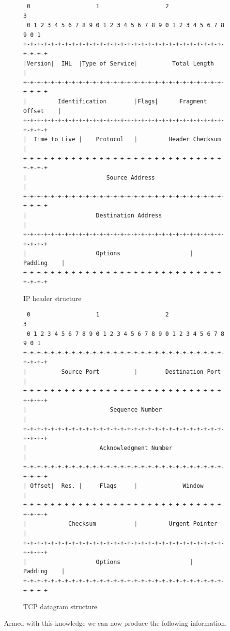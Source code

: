 \documentclass{article}
\begin{document}
\begin{figure}[H]
    \centering
    \caption{IP header structure}
    \begin{lstlisting}
 0                   1                   2                   3   
 0 1 2 3 4 5 6 7 8 9 0 1 2 3 4 5 6 7 8 9 0 1 2 3 4 5 6 7 8 9 0 1 
+-+-+-+-+-+-+-+-+-+-+-+-+-+-+-+-+-+-+-+-+-+-+-+-+-+-+-+-+-+-+-+-+
|Version|  IHL  |Type of Service|          Total Length         |
+-+-+-+-+-+-+-+-+-+-+-+-+-+-+-+-+-+-+-+-+-+-+-+-+-+-+-+-+-+-+-+-+
|         Identification        |Flags|      Fragment Offset    |
+-+-+-+-+-+-+-+-+-+-+-+-+-+-+-+-+-+-+-+-+-+-+-+-+-+-+-+-+-+-+-+-+
|  Time to Live |    Protocol   |         Header Checksum       |
+-+-+-+-+-+-+-+-+-+-+-+-+-+-+-+-+-+-+-+-+-+-+-+-+-+-+-+-+-+-+-+-+
|                       Source Address                          |
+-+-+-+-+-+-+-+-+-+-+-+-+-+-+-+-+-+-+-+-+-+-+-+-+-+-+-+-+-+-+-+-+
|                    Destination Address                        |
+-+-+-+-+-+-+-+-+-+-+-+-+-+-+-+-+-+-+-+-+-+-+-+-+-+-+-+-+-+-+-+-+
|                    Options                    |    Padding    |
+-+-+-+-+-+-+-+-+-+-+-+-+-+-+-+-+-+-+-+-+-+-+-+-+-+-+-+-+-+-+-+-+
    \end{lstlisting}
\end{figure}
\begin{figure}[H]
    \centering
    \caption{TCP datagram structure}
    \begin{lstlisting}
 0                   1                   2                   3
 0 1 2 3 4 5 6 7 8 9 0 1 2 3 4 5 6 7 8 9 0 1 2 3 4 5 6 7 8 9 0 1
+-+-+-+-+-+-+-+-+-+-+-+-+-+-+-+-+-+-+-+-+-+-+-+-+-+-+-+-+-+-+-+-+
|          Source Port          |        Destination Port       |
+-+-+-+-+-+-+-+-+-+-+-+-+-+-+-+-+-+-+-+-+-+-+-+-+-+-+-+-+-+-+-+-+
|                        Sequence Number                        |
+-+-+-+-+-+-+-+-+-+-+-+-+-+-+-+-+-+-+-+-+-+-+-+-+-+-+-+-+-+-+-+-+
|                     Acknowledgment Number                     |
+-+-+-+-+-+-+-+-+-+-+-+-+-+-+-+-+-+-+-+-+-+-+-+-+-+-+-+-+-+-+-+-+
| Offset|  Res. |     Flags     |             Window            |
+-+-+-+-+-+-+-+-+-+-+-+-+-+-+-+-+-+-+-+-+-+-+-+-+-+-+-+-+-+-+-+-+
|            Checksum           |         Urgent Pointer        |
+-+-+-+-+-+-+-+-+-+-+-+-+-+-+-+-+-+-+-+-+-+-+-+-+-+-+-+-+-+-+-+-+
|                    Options                    |    Padding    |
+-+-+-+-+-+-+-+-+-+-+-+-+-+-+-+-+-+-+-+-+-+-+-+-+-+-+-+-+-+-+-+-+
    \end{lstlisting}
\end{figure}
Armed with this knowledge we can now produce the following information.
\end{document}
